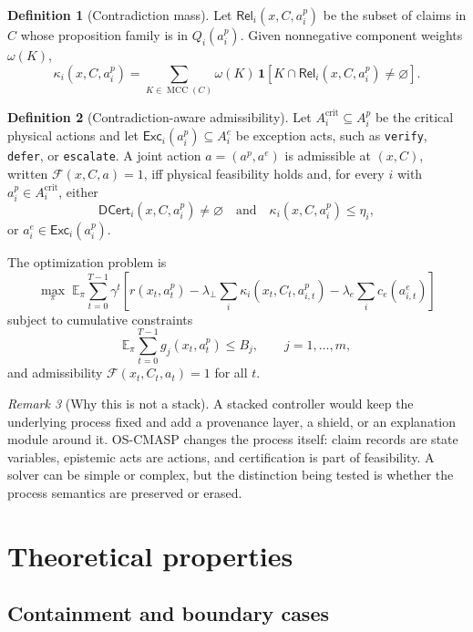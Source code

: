 \documentclass[11pt]{article}
\newcommand{\OSCMASP}{\mbox{\normalfont\textsc{OS-CMASP}}}
\newcommand{\MCC}{\operatorname{MCC}}
\newcommand{\DCert}{\mathsf{DCert}}
\newcommand{\Exc}{\mathsf{Exc}}
\newcommand{\Rel}{\mathsf{Rel}}
\newcommand{\E}{\mathbb{E}}
\newcommand{\1}{\mathbf{1}}
\theoremstyle{definition}
\newtheorem{definition}{Definition}[section]
\theoremstyle{plain}
\theoremstyle{remark}
\newtheorem{remark}[definition]{Remark}
\begin{document}
\begin{definition}[Contradiction mass]
\label{def:kappa}
Let $\Rel_i(x,C,a_i^p)$ be the subset of claims in $C$ whose proposition family is in $Q_i(a_i^p)$. Given nonnegative component weights $\omega(K)$,
\[
\kappa_i(x,C,a_i^p)=
\sum_{K\in\MCC(C)}\omega(K)\,\1[K\cap\Rel_i(x,C,a_i^p)\neq\varnothing].
\]
\end{definition}

\begin{definition}[Contradiction-aware admissibility]
\label{def:admissibility}
Let $A_i^{\mathrm{crit}}\subseteq A_i^p$ be the critical physical actions and let $\Exc_i(a_i^p)\subseteq A_i^e$ be exception acts, such as \texttt{verify}, \texttt{defer}, or \texttt{escalate}. A joint action $a=(a^p,a^e)$ is admissible at $(x,C)$, written $\mathcal F(x,C,a)=1$, iff physical feasibility holds and, for every $i$ with $a_i^p\in A_i^{\mathrm{crit}}$, either
\[
\DCert_i(x,C,a_i^p)\neq\varnothing
\quad\text{and}\quad
\kappa_i(x,C,a_i^p)\le \eta_i,
\]
or $a_i^e\in\Exc_i(a_i^p)$.
\end{definition}

The optimization problem is
\[
\max_{\pi}\;\E_{\pi}\sum_{t=0}^{T-1}\gamma^t
\left[r(x_t,a_t^p)-\lambda_{\bot}\sum_i\kappa_i(x_t,C_t,a_{i,t}^p)-\lambda_e\sum_i c_e(a_{i,t}^e)\right]
\]
subject to cumulative constraints
\[
\E_{\pi}\sum_{t=0}^{T-1}g_j(x_t,a_t^p)\le B_j,
\qquad j=1,\dots,m,
\]
and admissibility $\mathcal F(x_t,C_t,a_t)=1$ for all $t$.

\begin{remark}[Why this is not a stack]
A stacked controller would keep the underlying process fixed and add a provenance layer, a shield, or an explanation module around it. \OSCMASP{} changes the process itself: claim records are state variables, epistemic acts are actions, and certification is part of feasibility. A solver can be simple or complex, but the distinction being tested is whether the process semantics are preserved or erased.
\end{remark}

\section{Theoretical properties}
\label{sec:theory}

\subsection{Containment and boundary cases}
\end{document}
